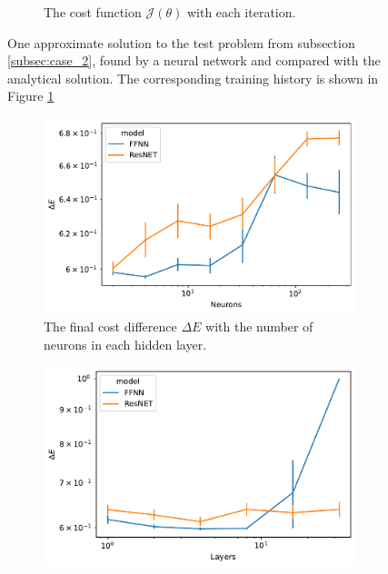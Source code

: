 \begin{figure}[b]
\begin{subfigure}[t]{0.5\textwidth}
        \caption{The cost function \(\mathcal{J}(\theta)\) with each iteration.}\label{fig:curve_2_history}
    \end{subfigure}
    \caption{One approximate solution to the test problem from subsection \ref{subsec:case_2}, found by a neural network and compared with the analytical solution. The corresponding training history is shown in Figure \ref{fig:curve_2_history} }\label{fig:curve_2_example}
\end{figure}

\begin{figure}[b]
    \begin{subfigure}[t]{0.5\textwidth}
        \centering
        \includegraphics[width=\linewidth]{figures/curve_2/exp_3/neurons_error.pdf}
        \caption{The final cost difference \(\Delta E\) with the number of neurons in each hidden layer.} \label{fig:curve_2_neuron_error}
    \end{subfigure}
    \begin{subfigure}[t]{0.5\textwidth}
        \centering
        \includegraphics[width=\linewidth]{figures/curve_2/exp_3/layer_error.pdf}

\end{subfigure}
\end{figure}
